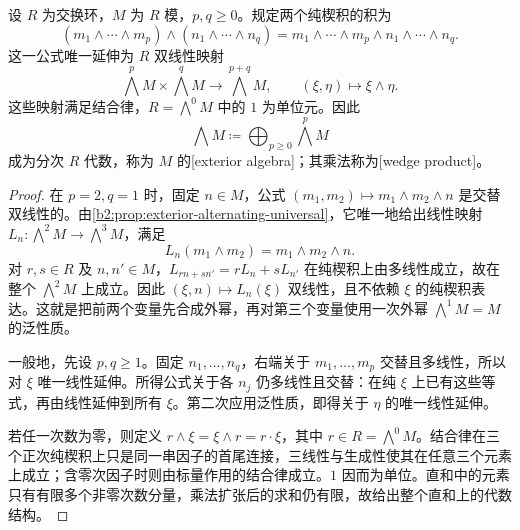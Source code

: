 \begin{proposition}\label{b2:prop:wedge-product}
	设 \(R\) 为交换环，\(M\) 为 \(R\) 模，\(p,q\ge0\)。规定两个纯楔积的积为
	\[
		(m_1\wedge\cdots\wedge m_p)\wedge(n_1\wedge\cdots\wedge n_q) =m_1\wedge\cdots\wedge m_p\wedge n_1\wedge\cdots\wedge n_q.
	\]
	这一公式唯一延伸为 \(R\) 双线性映射
	\[
		\bigwedge^pM\times\bigwedge^qM\longrightarrow\bigwedge^{p+q}M, \qquad(\xi,\eta)\longmapsto\xi\wedge\eta.
	\]
	这些映射满足结合律，\(R=\bigwedge^0M\) 中的 \(1\) 为单位元。因此
	\[
		\bigwedge M\coloneqq\bigoplus_{p\ge0}\bigwedge^pM
	\]
	成为分次 \(R\) 代数，称为 \(M\) 的[exterior algebra]；其乘法称为[wedge product]。
\end{proposition}
\begin{proof}
	在 \(p=2,q=1\) 时，固定 \(n\in M\)，公式 \((m_1,m_2)\mapsto m_1\wedge m_2\wedge n\) 是交替双线性的。由\cref{b2:prop:exterior-alternating-universal}，它唯一地给出线性映射 \(L_n:\bigwedge^2M\rightarrow\bigwedge^3M\)，满足
	\[
		L_n(m_1\wedge m_2)=m_1\wedge m_2\wedge n.
	\]
	对 \(r,s\in R\) 及 \(n,n'\in M\)，\(L_{rn+sn'}=r L_n+s L_{n'}\) 在纯楔积上由多线性成立，故在整个 \(\bigwedge^2M\) 上成立。因此 \((\xi,n)\mapsto L_n(\xi)\) 双线性，且不依赖 \(\xi\) 的纯楔积表达。这就是把前两个变量先合成外幂，再对第三个变量使用一次外幂 \(\bigwedge^1M=M\) 的泛性质。

	一般地，先设 \(p,q\ge1\)。固定 \(n_1,\ldots,n_q\)，右端关于 \(m_1,\ldots,m_p\) 交替且多线性，所以对 \(\xi\) 唯一线性延伸。所得公式关于各 \(n_j\) 仍多线性且交替：在纯 \(\xi\) 上已有这些等式，再由线性延伸到所有 \(\xi\)。第二次应用泛性质，即得关于 \(\eta\) 的唯一线性延伸。

	若任一次数为零，则定义 \(r\wedge\xi=\xi\wedge r=r\cdot\xi\)，其中 \(r\in R=\bigwedge^0M\)。结合律在三个正次纯楔积上只是同一串因子的首尾连接，三线性与生成性使其在任意三个元素上成立；含零次因子时则由标量作用的结合律成立。\(1\) 因而为单位。直和中的元素只有有限多个非零次数分量，乘法扩张后的求和仍有限，故给出整个直和上的代数结构。
\end{proof}

